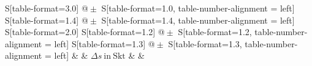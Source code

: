 \begin{table}[h!]
    \centering
    \caption{Natrium ($n=3,z=11$) -- Abschirmungszahl für jedes betrachtete Dublett, sowie bei der Berechnung verwendete Größen}
    \label{tab:Natrium}
    \begin{tabular}{
	S[table-format=3.0]
	@{${}\pm{}$}
	S[table-format=1.0, table-number-alignment = left]
	S[table-format=1.4]
	@{${}\pm{}$}
	S[table-format=1.4, table-number-alignment = left]
	S[table-format=2.0]
	S[table-format=1.2]
	@{${}\pm{}$}
	S[table-format=1.2, table-number-alignment = left]
	S[table-format=1.3]
	@{${}\pm{}$}
	S[table-format=1.3, table-number-alignment = left]
	}
	\toprule
			& 		& 
	{$\Delta s \ \mathrm{in} \ \mathrm{Skt}$}		& 		& 
			\\ 
	\midrule
    
    \bottomrule
    \end{tabular}
    \end{table}
